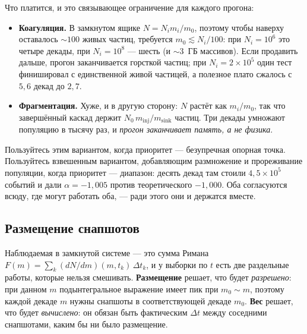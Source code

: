 \documentclass[a4paper,12pt]{article}
\newcommand{\minj}{m_{\mathrm{inj}}}
\newcommand{\msink}{m_{\mathrm{sink}}}
\begin{document}
Что платится, и это связывающее ограничение для каждого прогона:
\begin{itemize}
  \item \textbf{Коагуляция.} В замкнутом ящике $N = N_i m_i/m_0$, поэтому
        чтобы наверху оставалось $\sim100$ живых частиц, требуется
        $m_0 \lesssim N_i/100$: при $N_i = 10^6$ это четыре декады, при
        $N_i = 10^8$ --- шесть (и $\sim3$~ГБ массивов). Если продавить
        дальше, прогон заканчивается горсткой частиц; при
        $N_i = 2\times10^5$ один тест финишировал с единственной живой
        частицей, а полезное плато сжалось с $5{,}6$ декад до $2{,}7$.
  \item \textbf{Фрагментация.} Хуже, и в другую сторону: $N$ растёт как
        $m_i/m_0$, так что завершённый каскад держит $N_0\,\minj/\msink$
        частиц. Три декады умножают популяцию в тысячу раз, и \emph{прогон
        заканчивает память, а не физика}.
\end{itemize}

Пользуйтесь этим вариантом, когда приоритет --- безупречная опорная точка.
Пользуйтесь взвешенным вариантом, добавляющим размножение и прореживание
популяции, когда приоритет --- диапазон: десять декад там стоили
$4{,}5\times10^5$ событий и дали $\alpha = -1{,}005$ против теоретического
$-1{,}000$. Оба согласуются всюду, где могут работать оба, --- ради этого
они и держатся вместе.

\subsection{Размещение снапшотов}
\label{sec:trick10}

Наблюдаемая в замкнутой системе --- это сумма Римана
$F(m) = \sum_k (dN/dm)(m,t_k)\,\Delta t_k$, и у выборки по $t$ есть две
раздельные работы, которые нельзя смешивать. \textbf{Размещение} решает,
что будет \emph{разрешено}: при данном $m$ по\-дын\-те\-граль\-ное выражение
имеет
пик при $m_0 \sim m$, поэтому каждой декаде $m$ нужны снапшоты в
соответствующей декаде $m_0$. \textbf{Вес} решает, что будет
\emph{вычислено}: он обязан быть фактическим $\Delta t$ между соседними
снапшотами, каким бы ни было размещение.
\end{document}
